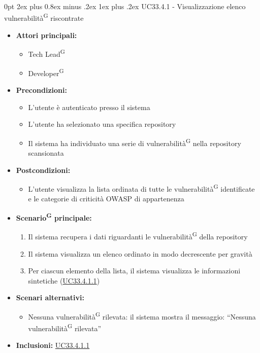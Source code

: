 \documentclass[a4paper, 11pt]{article}
\makeatletter
\renewcommand\subparagraph{\@startsection{subparagraph}{5}
  {0pt}
  {2ex plus 0.8ex minus .2ex}
  {1ex plus .2ex}
  {\normalfont\normalsize\bfseries\color{AccentColor}}}
\makeatother
\begin{document}
\subparagraph{UC33.4.1 - Visualizzazione elenco vulnerabilità\textsuperscript{G} riscontrate}\label{UC33.4.1}
\begin{itemize}
    \item \textbf{Attori principali:}
    \begin{itemize}
        \item Tech Lead\textsuperscript{G}
        \item Developer\textsuperscript{G}
    \end{itemize}
    \item \textbf{Precondizioni:}
    \begin{itemize}
        \item L'utente è autenticato presso il sistema
        \item L’utente ha selezionato una specifica repository
        \item Il sistema ha individuato una serie di vulnerabilità\textsuperscript{G} nella repository scansionata
    \end{itemize}
    \item \textbf{Postcondizioni:}
    \begin{itemize}
        \item L'utente visualizza la lista ordinata di tutte le vulnerabilità\textsuperscript{G} identificate e le categorie di criticità OWASP di appartenenza
    \end{itemize}
    \item \textbf{Scenario\textsuperscript{G} principale:}
    \begin{enumerate}
        \item Il sistema recupera i dati riguardanti le vulnerabilità\textsuperscript{G} della repository
        \item Il sistema visualizza un elenco ordinato in modo decrescente per gravità
        \item Per ciascun elemento della lista, il sistema visualizza le informazioni sintetiche (\hyperref[UC33.4.1.1]{UC33.4.1.1})
    \end{enumerate}
    \item \textbf{Scenari alternativi:}
    \begin{itemize}
        \item Nessuna vulnerabilità\textsuperscript{G} rilevata: il sistema mostra il messaggio: ``Nessuna vulnerabilità\textsuperscript{G} rilevata''
    \end{itemize}
    \item \textbf{Inclusioni:} \hyperref[UC33.4.1.1]{UC33.4.1.1}
\end{itemize}
\end{document}
